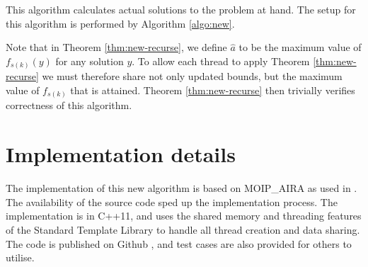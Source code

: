 \documentclass{amsart}
\theoremstyle{definition}
\begin{document}
\begin{algorithm}\label{algo:sub}
  \DontPrintSemicolon
  \caption{This algorithm calculates actual solutions to the problem at hand. The setup for this algorithm is performed by Algorithm \ref{algo:new}.}
\end{algorithm}

Note that in Theorem \ref{thm:new-recurse}, we define $\hat a$ to be the maximum value of $f_{s(k)}(y)$ for any solution $y$.
To allow each thread to apply Theorem \ref{thm:new-recurse} we must therefore share not only updated bounds, but the maximum value of $f_{s(k)}$ that is attained.
Theorem \ref{thm:new-recurse} then trivially verifies correctness of this algorithm.

\section{Implementation details}\label{sec:impl}

The implementation of this new algorithm is based on MOIP\_AIRA as used in \cite{OzlenPettersson2016BiObjective}.
The availability of the source code sped up the implementation process.
The implementation is in C++11, and uses the shared memory and threading features of the Standard Template Library to handle all thread creation and data sharing.
The code is published on Github \cite{moip_aira}, and test cases are also provided \cite{figshare:4obj} for others to utilise.
\end{document}
